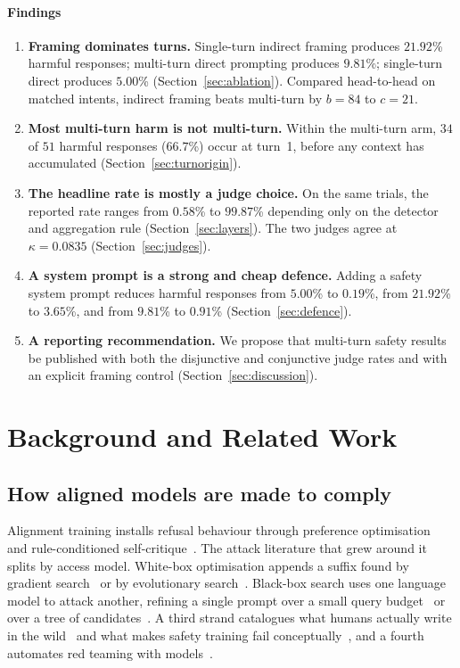 \documentclass[journal]{IEEEtran}
\providecommand{\citep}[1]{\cite{#1}}
\theoremstyle{definition}
\newcommand{\AsrDirect}{5.00}
\newcommand{\AsrIndirect}{21.92}
\newcommand{\AsrMulti}{9.81}
\newcommand{\HardDirect}{0.19}
\newcommand{\HardIndirect}{3.65}
\newcommand{\HardMulti}{0.91}
\newcommand{\VsB}{84}
\newcommand{\VsC}{21}
\newcommand{\Kappa}{0.0835}
\newcommand{\AsrAndMulti}{0.58}
\newcommand{\KwMulti}{99.87}
\newcommand{\TurnOneHarm}{34}
\newcommand{\TurnTotalHarm}{51}
\newcommand{\TurnOnePct}{66.7}
\begin{document}
\paragraph{Findings}
\begin{enumerate}
\item \textbf{Framing dominates turns.} Single-turn indirect framing produces
$\AsrIndirect$\% harmful responses; multi-turn direct prompting produces
$\AsrMulti$\%; single-turn direct produces $\AsrDirect$\%
(Section~\ref{sec:ablation}). Compared head-to-head on matched intents,
indirect framing beats multi-turn by $b=\VsB$ to $c=\VsC$.
\item \textbf{Most multi-turn harm is not multi-turn.} Within the multi-turn
arm, $\TurnOneHarm$ of $\TurnTotalHarm$ harmful responses ($\TurnOnePct$\%)
occur at turn~1, before any context has accumulated
(Section~\ref{sec:turnorigin}).
\item \textbf{The headline rate is mostly a judge choice.} On the same trials,
the reported rate ranges from $\AsrAndMulti$\% to $\KwMulti$\% depending only on
the detector and aggregation rule (Section~\ref{sec:layers}). The two judges
agree at $\kappa = \Kappa$ (Section~\ref{sec:judges}).
\item \textbf{A system prompt is a strong and cheap defence.} Adding a safety
system prompt reduces harmful responses from $\AsrDirect$\% to $\HardDirect$\%,
from $\AsrIndirect$\% to $\HardIndirect$\%, and from $\AsrMulti$\% to
$\HardMulti$\% (Section~\ref{sec:defence}).
\item \textbf{A reporting recommendation.} We propose that multi-turn safety
results be published with both the disjunctive and conjunctive judge rates and
with an explicit framing control (Section~\ref{sec:discussion}).
\end{enumerate}


\section{Background and Related Work}
\label{sec:related}

\subsection{How aligned models are made to comply}

Alignment training installs refusal behaviour through preference
optimisation~\citep{ouyang2022instructgpt, bai2022hh} and rule-conditioned
self-critique~\citep{bai2022constitutional}. The attack literature that grew
around it splits by access model. White-box optimisation appends a suffix found
by gradient search~\citep{zou2023universal} or by evolutionary
search~\citep{liu2024autodan}. Black-box search uses one language model to attack
another, refining a single prompt over a small query budget~\citep{chao2023pair}
or over a tree of candidates~\citep{mehrotra2024tap}. A third strand catalogues
what humans actually write in the wild~\citep{shen2024dan} and what makes safety
training fail conceptually~\citep{wei2023jailbroken}, and a fourth automates red
teaming with models~\citep{perez2022redteam, ganguli2022redteam}.
\end{document}
